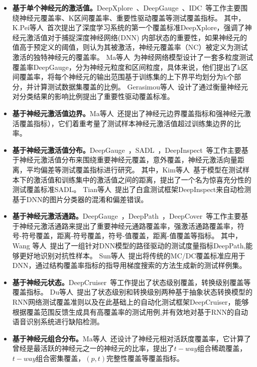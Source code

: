 \begin{itemize}
\item \textbf{基于单个神经元的激活值。}DeepXplore~、DeepGauge~、IDC~等工作主要围绕神经元覆盖率、K区间覆盖率、重要性驱动覆盖等测试覆盖指标。
其中，K.Pei等人~首次提出了深度学习系统的第一个覆盖标准DeepXplore，强调了神经元激活值对于捕捉深度神经网络(DNN) 内部状态的重要性，如果神经元的值高于预定义的阈值，则认为其被激活，神经元覆盖率（NC）被定义为测试激活的独特神经元的覆盖率。
Ma等人~为神经网络模型设计了一套多粒度测试覆盖率DeepGauge，分为神经元粒度和区间粒度，具体来说，他们提出了k区间覆盖率，将每个神经元的输出范围基于训练集的上下界平均划分为k个部分，并计算测试数据集覆盖的比例。
Gerasimou等人~设计了通过衡量神经元对分类结果的影响比例提出了重要性驱动覆盖标准。

\item \textbf{基于神经元激活值边界。}Ma等人~还提出了神经元边界覆盖指标和强神经元激活覆盖指标），它们着重考量了测试样本神经元激活值超过训练集边界的比率。

\item \textbf{基于神经元激活值分布。}DeepGauge~，SADL~，DeepInspect~等工作主要基于神经元激活值分布来围绕重要神经元覆盖，意外覆盖，神经元激活向量距离，平均偏差等测试覆盖指标进行研究。
其中，Kim等人~基于模型在测试样本下的激活值和训练集中的激活值之间的距离，提出了一个名为惊喜充分性的测试覆盖标准SADL。
Tian等人~提出了白盒测试框架DeepInspect来自动检测基于DNN的图片分类器的混淆和偏差错误。

\item \textbf{基于神经元激活通路。}DeepGauge~，DeepPath~，DeepCover~等工作主要基于神经元激活通路来提出了重要神经元通路覆盖率，强激活通路覆盖率，符号-符号覆盖，距离-符号覆盖，符号-值覆盖，距离-值覆盖等指标。
其中，Wang 等人~提出了一组针对DNN模型的路径驱动的测试度量指标DeepPath,能够更好地识别对抗性样本。
Sun等人~提出将传统的MC/DC覆盖标准应用于DNN，通过结构覆盖率指标的指导用梯度搜索的方法生成新的测试样例集。

\item \textbf{基于神经元状态。}DeepCruiser~等工作提出了状态级别覆盖，转换级别覆盖等覆盖指标。
Du等人~提出了状态级别和转换级别两种基于抽象状态转换模型的RNN网络测试覆盖准则以及在此基础上的自动化测试框架DeepCruiser，能够根据覆盖范围反馈生成具有高覆盖率的测试用例,并有效地对基于RNN的自动语音识别系统进行缺陷检测。

\item \textbf{基于神经元组合分布。}Ma等人~还设计了神经元相对活跃度覆盖率，它计算了曾经是最活跃的神经元之一的神经元的比率，提出了$t-way$组合稀疏覆盖，$t-way$组合密集覆盖，$(p,t)$完整性覆盖等覆盖指标。
\end{itemize}

